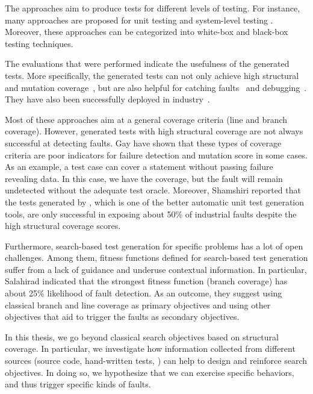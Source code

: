 The approaches aim to produce tests for different levels of testing. For instance, many approaches are proposed for unit testing \cite{Fraser2011, braione2017tardis, braione2018sushi, prasetya2013t3} and system-level testing \cite{Arcuri2019, Holler2012, Padhye2019, beyene2012, coppit2005, godefroid2008}. Moreover, these approaches can be categorized into white-box \cite{Fraser2011, braione2017tardis, braione2018sushi, prasetya2013t3, Arcuri2019} and black-box \cite{Holler2012, Padhye2019, beyene2012, coppit2005, godefroid2008} testing techniques. 

The evaluations that were performed indicate the usefulness of the generated tests. More specifically, the generated tests can not only achieve high structural and mutation coverage~\cite{Panichella2018a, Fraser2014b}, but are also helpful for catching faults~\cite{Shamshiri2016} and debugging~\cite{Ceccato2015}. They have also been successfully deployed in industry~\cite{Alshahwan2018, almasi2017industrial}.

Most of these approaches aim at a general coverage criteria (\eg line and branch coverage). However,  generated tests with high structural coverage are not always successful at detecting faults. Gay \etal \cite{gay2015risks} have shown that these types of coverage criteria are poor indicators for failure detection and mutation score in some cases. As an example, a test case can cover a statement without passing failure revealing data. In this case, we have the coverage, but the fault will remain undetected without the adequate test oracle.
Moreover, Shamshiri \etal \cite{Shamshiri2016} reported that the tests generated by \evosuite, which is one of the better automatic unit test generation tools, are only successful in exposing about 50\% of industrial faults despite the high structural coverage scores. 

Furthermore, search-based test generation for specific problems has a lot of open challenges. Among them, fitness functions defined for search-based test generation suffer from a lack of guidance and underuse contextual information.  
In particular, Salahirad \etal \cite{Salahirad2019} indicated that the strongest fitness function (branch coverage) has about 25\% likelihood of fault detection.
As an outcome, they suggest using classical branch and line coverage as primary objectives and using other objectives that aid to trigger the faults as secondary objectives.

\begin{framed}
In this thesis, we go beyond classical search objectives based on structural coverage. In particular, we investigate how information collected from different sources (\ie source code, hand-written tests, \etc) can help to design and reinforce search objectives. In doing so, we hypothesize that we can exercise specific behaviors, and thus trigger specific kinds of faults.
\end{framed}

